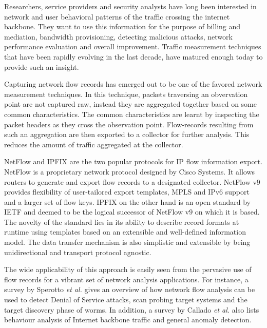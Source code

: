Researchers, service providers and security analysts have long been interested
in network and user behavioral patterns of the traffic crossing the internet
backbone. They want to use this information for the purpose of billing and
mediation, bandwidth provisioning, detecting malicious attacks, network
performance evaluation and overall improvement. Traffic measurement techniques
that have been rapidly evolving in the last decade, have matured enough today
to provide such an insight.

Capturing network flow records has emerged out to be one of the favored
network measurement techniques. In this technique, packets traversing an
obvervation point are not captured raw, instead they are aggregated together
based on some common characteristics. The common characteristics are learnt by
inspecting the packet headers as they cross the observation point.
Flow-records resulting from such an aggregation are then exported to a
collector for further analysis. This reduces the amount of traffic aggregated
at the collector.

NetFlow and \ac{IPFIX} are the two popular protocols for IP flow information
export. NetFlow \cite{rfc3954} is a proprietary network protocol designed by
Cisco Systems. It allows routers to generate and export flow records to a
designated collector. NetFlow v$9$ provides flexibility of user-tailored
export templates, \ac{MPLS} and IPv$6$ support and a larger set of flow keys.
\ac{IPFIX} \cite{rfc5101} on the other hand is an open standard by IETF and
deemed to be the logical successor of NetFlow v$9$ on which it is based. The
novelty of the standard lies in its ability to describe record formats at
runtime using templates based on an extensible and well-defined information
model. The data transfer mechanism is also simplistic and extensible by being
unidirectional and transport protocol agnostic.


The wide applicability of this approach is easily seen from the pervasive use
of flow records for a vibrant set of network analysis applications. For
instance, a survey by Sperotto \textit{et al.} \cite{sperotto:2010} gives an
overview of how network flow analysis can be used to detect Denial of Service
attacks, scan probing target systems and the target discovery phase of worms.
In addition, a survey by Callado \textit{et al.} \cite{callado:2009} also
lists behaviour analysis of Internet backbone traffic and general anomaly
detection.

